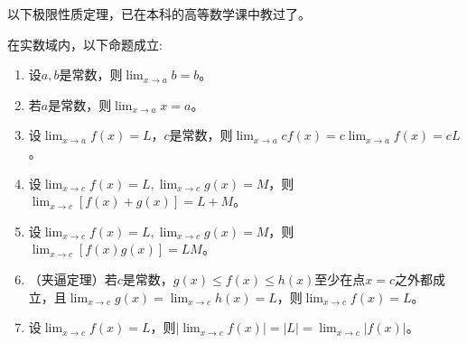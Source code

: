 \documentclass[main.tex]{subfiles}
\begin{document}
以下极限性质定理，已在本科的高等数学课中教过了。
\begin{theorem}[极限基本性质]\label{thm:II.4.4}
    在实数域内，以下命题成立:
    \begin{enumerate}
        \item 设$a,b$是常数，则$\lim_{x\to a}b=b$。
        \item 若$a$是常数，则$\lim_{x\to a} x=a$。
        \item 设$\lim_{x\to a}f\left(x\right)=L$，$c$是常数，则$\lim_{x\to a}cf\left(x\right)=c\lim_{x\to a}f\left(x\right)=cL$。
        \item 设$\lim_{x\to c}f\left(x\right)=L,\lim_{x\to c}g\left(x\right)=M$，则$\lim_{x\to c}\left[f\left(x\right)+g\left(x\right)\right]=L+M$。
        \item 设$\lim_{x\to c}f\left(x\right)=L,\lim_{x\to c}g\left(x\right)=M$，则$\lim_{x\to c}\left[f\left(x\right)g\left(x\right)\right]=LM$。
        \item （夹逼定理）若$c$是常数，$g\left(x\right)\leq f\left(x\right)\leq h\left(x\right)$至少在点$x=c$之外都成立，且$\lim_{x\to c}g\left(x\right)=\lim_{x\to c}h\left(x\right)=L$，则$\lim_{x\to c}f\left(x\right)=L$。
        \item 设$\lim_{x\to c}f\left(x\right)=L$，则$\left|\lim_{x\to c}f\left(x\right)\right|=\left|L\right|=\lim_{x\to c}\left|f\left(x\right)\right|$。
    \end{enumerate}
\end{theorem}
\end{document}
